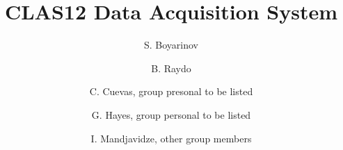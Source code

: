\title{CLAS12 Data Acquisition System}

\author[A]{S. Boyarinov}
\author[A]{B. Raydo}
\author[A]{C. Cuevas, group presonal to be listed}
\author[A]{G. Hayes, group personal to be listed}
\author[B]{I. Mandjavidze, other group members}

\address[A]{Thomas Jefferson National Accelerator Facility, Newport News, VA, USA}
\address[B]{Sacley, France}
\address[C]{INFN, Milan, Italy}
